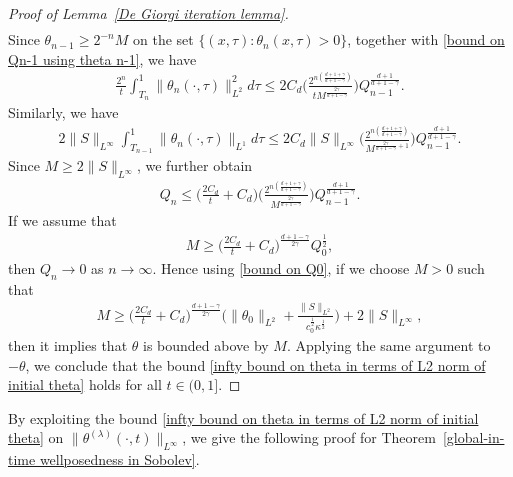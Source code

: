 \documentclass[reqno]{amsart}%
\theoremstyle{definition}
\theoremstyle{remark}
\numberwithin{equation}{section}
\newcommand{\thetalambda}{\theta^{(\lambda)}}
\newcommand{\1}{\mathbf{1}}
\numberwithin{equation}{section}
\numberwithin{theorem}{section}
\numberwithin{figure}{section}
\begin{document}
\begin{proof}[Proof of Lemma~\ref{De Giorgi iteration lemma}]
\begin{align}
\end{align}
Since $\theta_{n-1}\ge 2^{-n}M$ on the set $\{(x,\tau):\theta_{n}(x,\tau)>0\}$, together with \eqref{bound on Qn-1 using theta n-1}, we have
\begin{align*}
\frac{2^{n}}{t}\int_{T_{n}}^1\|\theta_{n}(\cdot,\tau)\|^2_{L^2}d\tau\le 2C_{d}\Big(\frac{2^{n(\frac{d+1+\gamma}{d+1-\gamma})}}{tM^{\frac{2\gamma}{d+1-\gamma}}}\Big)Q_{n-1}^\frac{d+1}{d+1-\gamma}.
\end{align*}
Similarly, we have
\begin{align*}
2\|S\|_{L^\infty}\int_{T_{n-1}}^1\|\theta_{n}(\cdot,\tau)\|_{L^1}d\tau\le 2C_{d}\|S\|_{L^\infty}\Big(\frac{2^{n(\frac{d+1+\gamma}{d+1-\gamma})}}{M^{\frac{2\gamma}{d+1-\gamma}+1}}\Big)Q_{n-1}^\frac{d+1}{d+1-\gamma}.
\end{align*}
Since $M\ge2\|S\|_{L^\infty}$, we further obtain
\begin{align*}
Q_{n}\le \Big(\frac{2C_{d}}{t}+C_{d}\Big)\Big(\frac{2^{n(\frac{d+1+\gamma}{d+1-\gamma})}}{M^{\frac{2\gamma}{d+1-\gamma}}}\Big)Q_{n-1}^\frac{d+1}{d+1-\gamma}.
\end{align*}
If we assume that
\begin{align}\label{bounding condition on M}
M\ge\Big(\frac{2C_d}{t}+C_d\Big)^\frac{d+1-\gamma}{2\gamma}Q_{0}^\frac{1}{2},
\end{align} 
then $Q_{n}\to0$ as $n\to\infty$. Hence using \eqref{bound on Q0}, if we choose $M>0$ such that
\begin{align*}
M\ge\Big(\frac{2C_d}{t}+C_d\Big)^\frac{d+1-\gamma}{2\gamma}\Big(\|\theta_0\|_{L^2}+\frac{\|S\|_{L^2}}{c_0^\frac{1}{2}\kappa^\frac{1}{2}}\Big)+2\|S\|_{L^\infty},
\end{align*}
then it implies that $\theta$ is bounded above by $M$. Applying the same argument to $-\theta$, we conclude that the bound \eqref{infty bound on theta in terms of L2 norm of initial theta} holds for all $t\in(0,1]$.
\end{proof}
By exploiting the bound \eqref{infty bound on theta in terms of L2 norm of initial theta} on $\|\thetalambda(\cdot,t)\|_{L^\infty}$, we give the following proof for Theorem~\ref{global-in-time wellposedness in Sobolev}.
\end{document}
